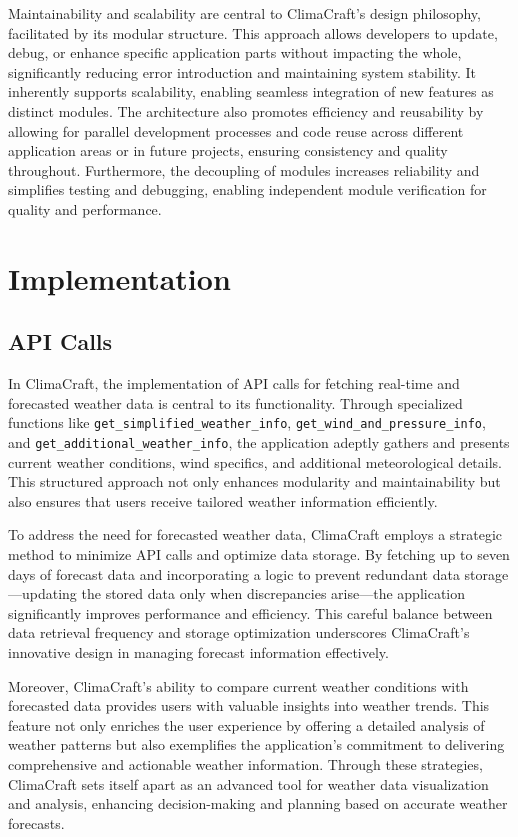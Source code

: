 \documentclass[sn-mathphys-num]{sn-jnl}%
\begin{document}
Maintainability and scalability are central to ClimaCraft’s design philosophy, facilitated by its modular structure. This approach allows developers to update, debug, or enhance specific application parts without impacting the whole, significantly reducing error introduction and maintaining system stability. It inherently supports scalability, enabling seamless integration of new features as distinct modules. The architecture also promotes efficiency and reusability by allowing for parallel development processes and code reuse across different application areas or in future projects, ensuring consistency and quality throughout. Furthermore, the decoupling of modules increases reliability and simplifies testing and debugging, enabling independent module verification for quality and performance.

\section{Implementation}\label{sec3}

\subsection{API Calls}\label{sec3.1}

In ClimaCraft, the implementation of API calls for fetching real-time and forecasted weather data is central to its functionality. Through specialized functions like \texttt{get\_simplified\_weather\_info}, \texttt{get\_wind\_and\_pressure\_info}, and \texttt{get\_additional\_weather\_info}, the application adeptly gathers and presents current weather conditions, wind specifics, and additional meteorological details. This structured approach not only enhances modularity and maintainability but also ensures that users receive tailored weather information efficiently.

To address the need for forecasted weather data, ClimaCraft employs a strategic method to minimize API calls and optimize data storage. By fetching up to seven days of forecast data and incorporating a logic to prevent redundant data storage—updating the stored data only when discrepancies arise—the application significantly improves performance and efficiency. This careful balance between data retrieval frequency and storage optimization underscores ClimaCraft's innovative design in managing forecast information effectively.

Moreover, ClimaCraft's ability to compare current weather conditions with forecasted data provides users with valuable insights into weather trends. This feature not only enriches the user experience by offering a detailed analysis of weather patterns but also exemplifies the application's commitment to delivering comprehensive and actionable weather information. Through these strategies, ClimaCraft sets itself apart as an advanced tool for weather data visualization and analysis, enhancing decision-making and planning based on accurate weather forecasts.
\end{document}
